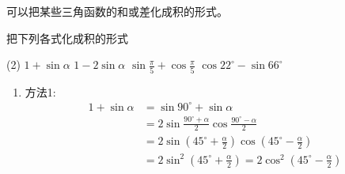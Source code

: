 可以把某些三角函数的和或差化成积的形式。


\begin{example}
    把下列各式化成积的形式

\begin{tasks}(2)
    \task $1+\sin\alpha$
    \task $1-2\sin\alpha$
    \task $\sin\frac{\pi}{5}+\cos\frac{\pi}{5}$
    \task $\cos22^{\circ}-\sin 66^{\circ}$
\end{tasks}
\end{example}

\begin{solution}
\begin{enumerate}
    \item 方法1: 
\[\begin{split}
    1+\sin\alpha&=\sin90^{\circ}+\sin\alpha\\
    &=2\sin\frac{90^{\circ}+\alpha}{2}\cos\frac{90^{\circ}-\alpha}{2}\\
    &=2\sin\left(45^{\circ}+\frac{\alpha}{2}\right)\cos\left(45^{\circ}-\frac{\alpha}{2}\right)\\
    &=2\sin^2\left(45^{\circ}+\frac{\alpha}{2}\right)=2\cos^2\left(45^{\circ}-\frac{\alpha}{2}\right)
\end{split}\]


\end{enumerate}
\end{solution}
